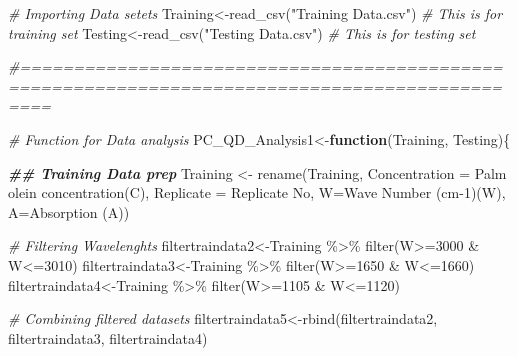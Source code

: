 \documentclass[
]{article}
\newenvironment{Shaded}{\begin{snugshade}}{\end{snugshade}}
\newcommand{\AttributeTok}[1]{\textcolor[rgb]{0.77,0.63,0.00}{#1}}
\newcommand{\CommentTok}[1]{\textcolor[rgb]{0.56,0.35,0.01}{\textit{#1}}}
\newcommand{\ControlFlowTok}[1]{\textcolor[rgb]{0.13,0.29,0.53}{\textbf{#1}}}
\newcommand{\DecValTok}[1]{\textcolor[rgb]{0.00,0.00,0.81}{#1}}
\newcommand{\DocumentationTok}[1]{\textcolor[rgb]{0.56,0.35,0.01}{\textbf{\textit{#1}}}}
\newcommand{\FunctionTok}[1]{\textcolor[rgb]{0.00,0.00,0.00}{#1}}
\newcommand{\NormalTok}[1]{#1}
\newcommand{\OtherTok}[1]{\textcolor[rgb]{0.56,0.35,0.01}{#1}}
\newcommand{\SpecialCharTok}[1]{\textcolor[rgb]{0.00,0.00,0.00}{#1}}
\newcommand{\StringTok}[1]{\textcolor[rgb]{0.31,0.60,0.02}{#1}}
\begin{document}
\begin{Shaded}
\begin{Highlighting}[]
\CommentTok{\# Importing Data setets}
\NormalTok{Training}\OtherTok{\textless{}{-}}\FunctionTok{read\_csv}\NormalTok{(}\StringTok{"Training Data.csv"}\NormalTok{) }\CommentTok{\# This is for training set}
\NormalTok{Testing}\OtherTok{\textless{}{-}}\FunctionTok{read\_csv}\NormalTok{(}\StringTok{"Testing Data.csv"}\NormalTok{) }\CommentTok{\# This is for testing set}

\CommentTok{\#===============================================================================================}

\CommentTok{\# Function for Data analysis}
\NormalTok{PC\_QD\_Analysis1}\OtherTok{\textless{}{-}}\ControlFlowTok{function}\NormalTok{(Training, Testing)\{}
  
  \DocumentationTok{\#\# Training Data prep}
\NormalTok{  Training }\OtherTok{\textless{}{-}} \FunctionTok{rename}\NormalTok{(Training, }\AttributeTok{Concentration =} \StringTok{\textasciigrave{}}\AttributeTok{Palm olein concentration(C)}\StringTok{\textasciigrave{}}\NormalTok{, }
                     \AttributeTok{Replicate =} \StringTok{\textasciigrave{}}\AttributeTok{Replicate No}\StringTok{\textasciigrave{}}\NormalTok{, }\AttributeTok{W=}\StringTok{\textasciigrave{}}\AttributeTok{Wave Number (cm{-}1)(W)}\StringTok{\textasciigrave{}}\NormalTok{, }\AttributeTok{A=}\StringTok{\textasciigrave{}}\AttributeTok{Absorption (A)}\StringTok{\textasciigrave{}}\NormalTok{)}
  
  \CommentTok{\# Filtering Wavelenghts}
\NormalTok{  filtertraindata2}\OtherTok{\textless{}{-}}\NormalTok{Training }\SpecialCharTok{\%\textgreater{}\%} \FunctionTok{filter}\NormalTok{(W}\SpecialCharTok{\textgreater{}=}\DecValTok{3000} \SpecialCharTok{\&}\NormalTok{ W}\SpecialCharTok{\textless{}=}\DecValTok{3010}\NormalTok{)}
\NormalTok{  filtertraindata3}\OtherTok{\textless{}{-}}\NormalTok{Training }\SpecialCharTok{\%\textgreater{}\%} \FunctionTok{filter}\NormalTok{(W}\SpecialCharTok{\textgreater{}=}\DecValTok{1650} \SpecialCharTok{\&}\NormalTok{ W}\SpecialCharTok{\textless{}=}\DecValTok{1660}\NormalTok{)}
\NormalTok{  filtertraindata4}\OtherTok{\textless{}{-}}\NormalTok{Training }\SpecialCharTok{\%\textgreater{}\%} \FunctionTok{filter}\NormalTok{(W}\SpecialCharTok{\textgreater{}=}\DecValTok{1105} \SpecialCharTok{\&}\NormalTok{ W}\SpecialCharTok{\textless{}=}\DecValTok{1120}\NormalTok{)}
  
  \CommentTok{\# Combining filtered datasets}
\NormalTok{  filtertraindata5}\OtherTok{\textless{}{-}}\FunctionTok{rbind}\NormalTok{(filtertraindata2, filtertraindata3, filtertraindata4) }
  

\end{Highlighting}
\end{Shaded}
\end{document}
